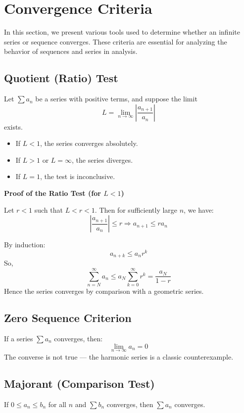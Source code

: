 \newpage
\section{Convergence Criteria}

In this section, we present various tools used to determine whether an infinite series or sequence converges. These criteria are essential for analyzing the behavior of sequences and series in analysis.

\subsection{Quotient (Ratio) Test}

Let \(\sum a_n\) be a series with positive terms, and suppose the limit
\[
L = \lim_{n \to \infty} \left| \frac{a_{n+1}}{a_n} \right|
\]
exists.

\begin{itemize}[label=\(-\)]
\item If \(L < 1\), the series converges absolutely.
\item If \(L > 1\) or \(L = \infty\), the series diverges.
\item If \(L = 1\), the test is inconclusive.
\end{itemize}

\textbf{Proof of the Ratio Test (for \(L < 1\))}

Let \(r < 1\) such that \(L < r < 1\). Then for sufficiently large \(n\), we have:
\[
\left| \frac{a_{n+1}}{a_n} \right| \le r \Rightarrow a_{n+1} \le r a_n
\]

By induction:
\[
a_{n+k} \le a_n r^k
\]
So,
\[
\sum_{n=N}^\infty a_n \le a_N \sum_{k=0}^\infty r^k = \frac{a_N}{1 - r}
\]
Hence the series converges by comparison with a geometric series.

\subsection{Zero Sequence Criterion}

If a series \(\sum a_n\) converges, then:
\[
\lim_{n \to \infty} a_n = 0
\]
The converse is not true — the harmonic series is a classic counterexample.

\subsection{Majorant (Comparison Test)} 

If \(0 \le a_n \le b_n\) for all \(n\) and \(\sum b_n\) converges, then \(\sum a_n\) converges.

